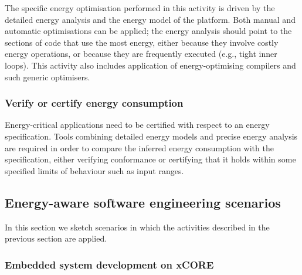 \documentclass[oneside]{book}
\begin{document}
The specific energy optimisation performed in this activity 
is driven by the detailed energy analysis
and the energy model of the platform.  Both manual and automatic
optimisations can be applied; the energy analysis should point to the sections of
code that use the most energy, either because they involve costly energy operations,
or because they are frequently executed (e.g., tight inner loops).
This activity also includes application of energy-optimising compilers and such
generic optimisers.

\subsubsection{Verify or certify energy consumption}\label{certify}

Energy-critical applications need to be certified with respect to an
energy specification. Tools combining detailed energy models and
precise energy analysis are required in order to compare the inferred
energy consumption with the specification, either verifying conformance or 
certifying that it holds within some specified limits of behaviour such
as input ranges.


\subsection{Energy-aware software engineering scenarios}\label{sweng-scenarios}


In this section we sketch scenarios in which the activities described
in the previous section are applied.

\subsubsection{Embedded system development on xCORE}\label{xcore-scenario}
\end{document}
